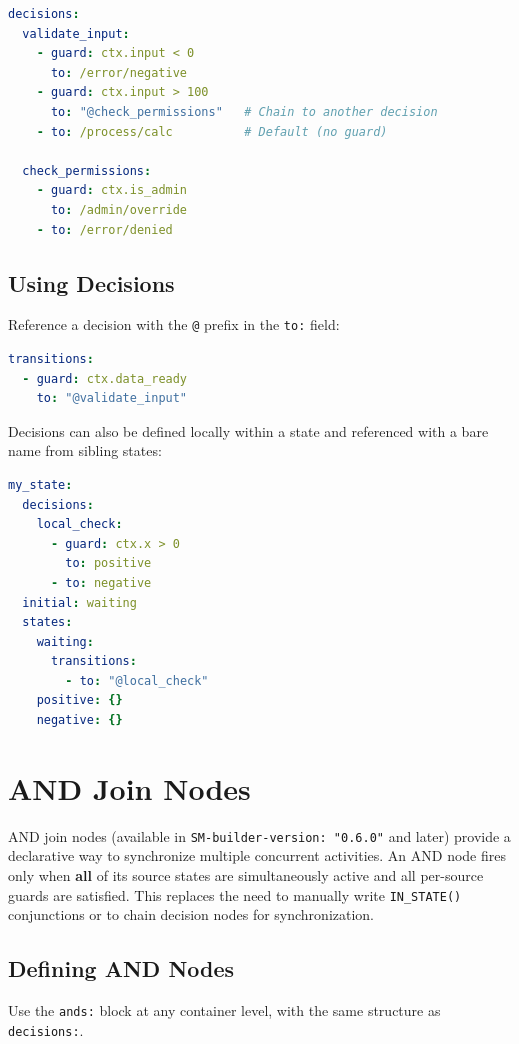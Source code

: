 \documentclass[a4paper,11pt]{article}
\begin{document}
\begin{lstlisting}[language=YAML, caption={Decision tree definition}]
decisions:
  validate_input:
    - guard: ctx.input < 0
      to: /error/negative
    - guard: ctx.input > 100
      to: "@check_permissions"   # Chain to another decision
    - to: /process/calc          # Default (no guard)

  check_permissions:
    - guard: ctx.is_admin
      to: /admin/override
    - to: /error/denied
\end{lstlisting}

\subsection{Using Decisions}
Reference a decision with the \texttt{@} prefix in the \texttt{to:} field:

\begin{lstlisting}[language=YAML, caption={Using a decision in a transition}]
transitions:
  - guard: ctx.data_ready
    to: "@validate_input"
\end{lstlisting}

Decisions can also be defined locally within a state and referenced with a bare name from sibling states:

\begin{lstlisting}[language=YAML, caption={Local decision definition}]
my_state:
  decisions:
    local_check:
      - guard: ctx.x > 0
        to: positive
      - to: negative
  initial: waiting
  states:
    waiting:
      transitions:
        - to: "@local_check"
    positive: {}
    negative: {}
\end{lstlisting}

\section{AND Join Nodes}
\label{sec:and}
AND join nodes (available in \texttt{SM-builder-version: "0.6.0"} and later) provide a declarative way to synchronize multiple concurrent activities. An AND node fires only when \textbf{all} of its source states are simultaneously active and all per-source guards are satisfied. This replaces the need to manually write \texttt{IN\_STATE()} conjunctions or to chain decision nodes for synchronization.

\subsection{Defining AND Nodes}
Use the \texttt{ands:} block at any container level, with the same structure as \texttt{decisions:}.
\end{document}
